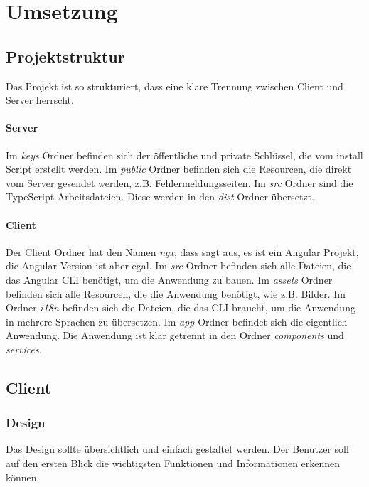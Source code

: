\section{Umsetzung}
\label{sec:umsetzung}

\subsection{Projektstruktur}
\label{sec:ums-projektstruktur}

Das Projekt ist so strukturiert, dass eine klare Trennung zwischen Client und Server herrscht.
\paragraph*{Server} Im \textit{keys} Ordner befinden sich der öffentliche und private Schlüssel, die vom install Script erstellt werden. Im \textit{public} Ordner befinden sich die Resourcen, die direkt vom Server gesendet werden, z.B. Fehlermeldungsseiten. Im \textit{src} Ordner sind die TypeScript Arbeitsdateien. Diese werden in den \textit{dist} Ordner übersetzt.
\paragraph*{Client} Der Client Ordner hat den Namen \textit{ngx}, dass sagt aus, es ist ein Angular Projekt, die Angular Version ist aber egal. Im \textit{src} Ordner befinden sich alle Dateien, die das Angular \ac{CLI} benötigt, um die Anwendung zu bauen. Im \textit{assets} Ordner befinden sich alle Resourcen, die die Anwendung benötigt, wie z.B. Bilder. Im Ordner \textit{i18n} befinden sich die Dateien, die das \ac{CLI} braucht, um die Anwendung in mehrere Sprachen zu übersetzen. Im \textit{app} Ordner befindet sich die eigentlich Anwendung. Die Anwendung ist klar getrennt in den Ordner \textit{components} und \textit{services}.
\newpage
\subsection{Client}
\label{sec:ums-client}

\subsubsection{Design}
\label{sec:ums-client-design}
Das Design sollte übersichtlich und einfach gestaltet werden. Der Benutzer soll auf den ersten Blick die wichtigsten Funktionen und Informationen erkennen können. \\

